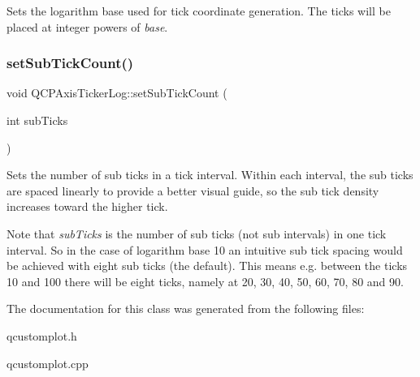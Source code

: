 Sets the logarithm base used for tick coordinate generation. The ticks will be placed at integer powers of {\itshape base}. \mbox{\label{classQCPAxisTickerLog_ad51989c798c0cfd50936d77aac57c56a}} 
\subsubsection{\texorpdfstring{set\+Sub\+Tick\+Count()}{setSubTickCount()}}
{\footnotesize\ttfamily void Q\+C\+P\+Axis\+Ticker\+Log\+::set\+Sub\+Tick\+Count (\begin{DoxyParamCaption}\item[{int}]{sub\+Ticks }\end{DoxyParamCaption})}

Sets the number of sub ticks in a tick interval. Within each interval, the sub ticks are spaced linearly to provide a better visual guide, so the sub tick density increases toward the higher tick.

Note that {\itshape sub\+Ticks} is the number of sub ticks (not sub intervals) in one tick interval. So in the case of logarithm base 10 an intuitive sub tick spacing would be achieved with eight sub ticks (the default). This means e.\+g. between the ticks 10 and 100 there will be eight ticks, namely at 20, 30, 40, 50, 60, 70, 80 and 90. 

The documentation for this class was generated from the following files\+:\begin{DoxyCompactItemize}
\item 
qcustomplot.\+h\item 
qcustomplot.\+cpp\end{DoxyCompactItemize}
